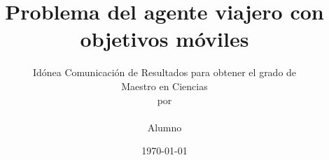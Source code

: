 \documentclass[11pt,titlepage,letterpaper]{book}
\title{\textbf{Problema del agente viajero con objetivos móviles}}
\author{Idónea Comunicación de Resultados para obtener el grado de \\ Maestro en Ciencias\\ por \\\\Alumno}
\date{\today}
\begin{document}
   \def\contentsname{Contenido}
   \def\listfigurename{Lista de Figuras}
  \def\listtablename{Lista de Tablas} 
   \def\bibname{Bibliografía}



\thispagestyle{empty}
\newpage
{}





\tableofcontents
\listoffigures
\listoftables
\listofalgorithms


%










\end{document}
